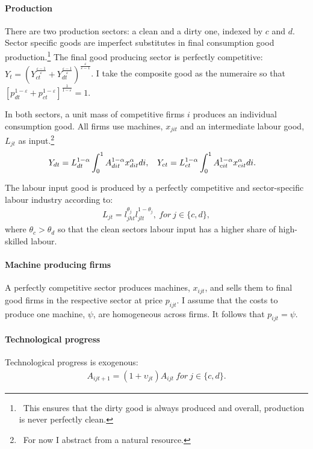 \paragraph{Production}
There are two production sectors: a clean and a dirty one, indexed by $c$ and $d$. Sector specific goods are imperfect substitutes in final consumption good production.\footnote{\ This ensures that the dirty good is always produced and overall, production is never perfectly clean.}  
The final good producing sector is perfectly competitive:
$Y_t=\left(Y_{ct}^{\frac{\varepsilon-1}{\varepsilon}}+Y_{dt}^{\frac{\varepsilon-1}{\varepsilon}}\right)^\frac{\varepsilon}{\varepsilon-1}$. 
I take the composite good as the numeraire so that $\left[p_{dt}^{1-\varepsilon}+p_{ct}^{1-\varepsilon}\right]^{\frac{1}{1-\varepsilon}}=1$.

In both sectors, a unit mass of competitive firms $i$ produces an individual consumption good. All firms use machines, $x_{jit}$ and an intermediate labour good, $L_{jt}$ as input.\footnote{\ For now I abstract from a natural resource.} 
\begin{align*}
&Y_{dt}= L_{dt}^{1-\alpha}\int_{0}^{1}A_{dit}^{1-\alpha}x_{dit}^{\alpha} di,\ \hspace{2mm} Y_{ct}= L_{ct}^{1-\alpha}\int_{0}^{1}A_{cit}^{1-\alpha}x_{cit}^{\alpha} di.
\end{align*}

The labour input good is produced by a perfectly competitive and sector-specific labour industry according to: 
\begin{align}
L_{jt}=l_{jht}^{\theta_j}l_{jlt}^{1-\theta_j}, \ for \ j \in\{c,d\},
\end{align}
where $\theta_c>\theta_d$ so that the clean sectors labour input has a higher share of high-skilled labour. 


\paragraph{Machine producing firms}
A perfectly competitive sector produces machines, $x_{ijt}$, and sells them to final good firms in the respective sector at price $p_{ijt}$. I assume that the costs to produce one machine, $\psi$, are homogeneous across firms. It follows that $p_{ijt}=\psi$.


\paragraph{Technological progress}
Technological progress is exogenous:
\begin{align}
A_{ijt+1}=(1+\upsilon_{jt}) A_{ijt}\ for \ j \in\{c,d\}. 
\end{align}

